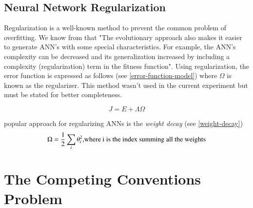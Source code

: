 \documentclass[a4paper,12pt, oneside]{memoir}
\begin{document}
\subsection{Neural Network Regularization}
Regularization is a well-known method to prevent the common problem of overfitting. We know from \cite{yao-1999} that "The evolutionary approach also makes it easier to generate ANN’s with some special characteristics. For example, the ANN’s complexity can be decreased and its generalization increased by including a complexity (regularization) term in the fitness function". Using regularization, the error function is expressed as follows (see \ref{error-function-model}) where $\Omega$ is known as the regularizer. This method wasn't used in the current experiment but must be stated for better completeness.

\begin{equation}\label{error-function-model}
  J = E + \Lambda\Omega
\end{equation}

\cite{yaochu-2004} popular approach for regularizing ANNs is the \textit{weight decay} (see \ref{weight-decay})
\begin{equation}\label{weight-decay}
  \Omega = {1 \over 2} \sum_{i}^{} \theta_{i}^{2} \text{,where i is the index summing all the weights}
\end{equation}

\section{The Competing Conventions Problem}
\end{document}
